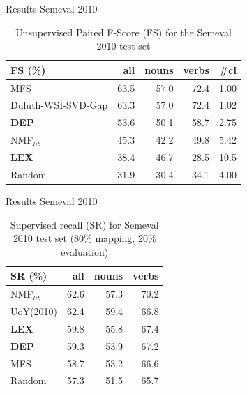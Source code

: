 \documentclass[10pt,xcolor=table]{beamer}
\begin{document}
\begin{frame}{Results Semeval 2010}
\begin{table}[]
\centering

\begin{tabular}{@{}lrrrr@{}}
\toprule
\textbf{FS (\%)} & \textbf{all} & \textbf{nouns} & \textbf{verbs} & \textbf{\#cl} \\ \midrule
MFS & 63.5 & 57.0 & 72.4 & 1.00 \\
Duluth-WSI-SVD-Gap & 63.3 & 57.0 & 72.4 & 1.02 \\
\textbf{DEP} & 53.6 & 50.1 & 58.7 & 2.75 \\
NMF$_{lib}$&45.3&42.2&49.8&5.42\\
\textbf{LEX} & 38.4 & 46.7 & 28.5 & 10.5 \\
Random & 31.9 & 30.4 & 34.1 & 4.00 \\ \bottomrule
\end{tabular}
\caption{Unsupervised Paired F-Score (FS) for the Semeval 2010 test set}
\label{tab:sem2010_FS}
\end{table}
\end{frame}

\begin{frame}{Results Semeval 2010}
\begin{table}
\centering

\begin{tabular}{@{}lrrr@{}}
\toprule
\textbf{SR (\%)} & \textbf{all} & \textbf{nouns} & \textbf{verbs} \\ \midrule
NMF$_{lib}$&62.6&57.3&70.2\\
UoY(2010) & 62.4 & 59.4 & 66.8 \\

\textbf{LEX} & 59.8 & 55.8 & 67.4 \\
\textbf{DEP} & 59.3 & 53.9 & 67.2 \\
MFS & 58.7 & 53.2 & 66.6 \\
Random & 57.3 & 51.5 & 65.7 \\ \bottomrule

\end{tabular}

\caption{Supervised recall (SR) for Semeval 2010 test set (80\% mapping, 20\% evaluation)}
\label{tab:sem2010_SR}
\end{table}
\end{frame}
\end{document}
